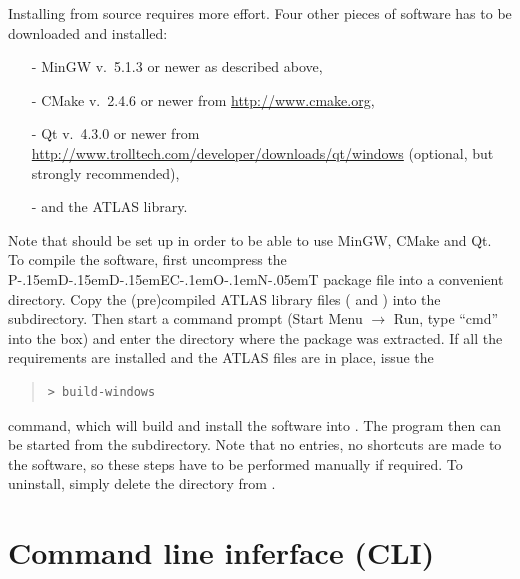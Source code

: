 \documentclass[10pt,a4paper]{ddedoc}
\def\pdde{{P\kern-.15emD\kern-.15emD\kern-.15emE\raisebox{.25ex}{-}C\kern-.1emO\kern-.1emN\kern-.05emT}}
\begin{document}
Installing from source requires more effort. Four other pieces of software has
to be downloaded and installed:
\begin{itemize}
\item[-] MinGW v.\ 5.1.3 or newer as described above,
\item[-] CMake v.\ 2.4.6 or newer from \url{http://www.cmake.org},
\item[-] Qt v.\ 4.3.0 or newer from
\url{http://www.trolltech.com/developer/downloads/qt/windows} (optional, but strongly recommended),
\item[-] and the ATLAS library.
\end{itemize}
Note that  should be set up in order to be able to use MinGW, CMake and Qt. 
To compile the software, first uncompress the \pdde{} package file
 into a convenient directory.
Copy the (pre)compiled ATLAS library files ( and
) into the  subdirectory.
Then start a command prompt (Start Menu $\rightarrow$ Run, type ``cmd'' into the
box) and enter the directory  where the package was
extracted. If all the requirements are installed and the ATLAS files are in
place, issue the
{ \small \begin{quote} \begin{lstlisting}[basicstyle=\tt,frame=single]
 > build-windows
\end{lstlisting} \end{quote} } \noindent
command, which will build and install the software into . The program then can be started from the 
subdirectory. Note that no  entries, no shortcuts are made to
the software, so these steps have to be performed manually if required. To
uninstall, simply delete the  directory from .

\section{Command line inferface (CLI)}
\end{document}
